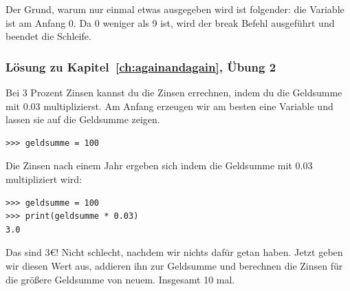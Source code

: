 \noindent
Der Grund, warum nur einmal etwas ausgegeben wird ist folgender: die Variable  ist am Anfang 0. Da 0 weniger als 9 ist, wird der break Befehl ausgeführt und beendet die Schleife.

\noindent
\subsubsection{Lösung zu Kapitel~\ref{ch:againandagain}, Übung 2}
Bei 3 Prozent Zinsen kannst du die Zinsen errechnen, indem du die Geldsumme mit 0.03 multiplizierst. Am Anfang erzeugen wir am besten eine Variable und lassen sie auf die Geldsumme zeigen.

\begin{Verbatim}[frame=single]
>>> geldsumme = 100
\end{Verbatim}

Die Zinsen nach einem Jahr ergeben sich indem die Geldsumme mit 0.03 multipliziert wird:

\begin{Verbatim}[frame=single]
>>> geldsumme = 100
>>> print(geldsumme * 0.03)
3.0
\end{Verbatim}

Das sind 3€! Nicht schlecht, nachdem wir nichts dafür getan haben. Jetzt geben wir diesen Wert aus, addieren ihn zur Geldsumme und berechnen die Zinsen für die größere Geldsumme von neuem. Insgesamt 10 mal.

